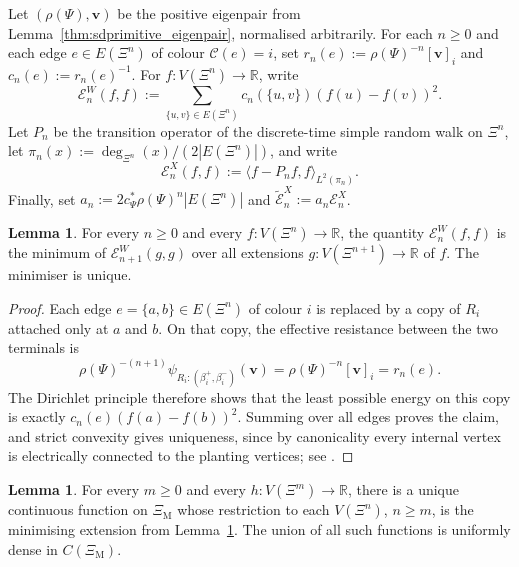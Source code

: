 \documentclass{article}
\theoremstyle{plain}
\theoremstyle{definition}
\newtheorem{lemma}[theorem]{Lemma}
\begin{document}
Let $(\rho(\Psi),\mathbf v)$ be the positive eigenpair from Lemma~\ref{thm:sdprimitive_eigenpair}, normalised arbitrarily.
For each $n\ge 0$ and each edge $e\in E(\Xi^n)$ of colour $\mathscr C(e)=i$, set $r_n(e):=\rho(\Psi)^{-n}[\mathbf v]_i$ and $c_n(e):=r_n(e)^{-1}$.
For $f:V(\Xi^n)\to\mathbb R$, write
\[
\mathcal E_n^{W}(f,f):=\sum_{\{u,v\}\in E(\Xi^n)} c_n(\{u,v\})(f(u)-f(v))^2.
\]
Let $P_n$ be the transition operator of the discrete-time simple random walk on $\Xi^n$, let $\pi_n(x):=\deg_{\Xi^n}(x)/(2|E(\Xi^n)|)$, and write
\[
\mathcal E_n^{X}(f,f):=\langle f-P_nf,f\rangle_{L^2(\pi_n)}.
\]
Finally, set $a_n:=2c_\Psi^*\rho(\Psi)^n|E(\Xi^n)|$ and $\widetilde{\mathcal E}_n^{X}:=a_n\mathcal E_n^{X}$.

\begin{lemma}\label{lem:sec31_trace_weighted}
For every $n\ge 0$ and every $f:V(\Xi^n)\to\mathbb R$, the quantity $\mathcal E_n^{W}(f,f)$ is the minimum of $\mathcal E_{n+1}^{W}(g,g)$ over all extensions $g:V(\Xi^{n+1})\to\mathbb R$ of $f$.
The minimiser is unique.
\end{lemma}

\begin{proof}
Each edge $e=\{a,b\}\in E(\Xi^n)$ of colour $i$ is replaced by a copy of $R_i$ attached only at $a$ and $b$.
On that copy, the effective resistance between the two terminals is
\[
\rho(\Psi)^{-(n+1)}\psi_{R_i:(\beta_i^+,\beta_i^-)}(\mathbf v)
=
\rho(\Psi)^{-n}[\mathbf v]_i
=
r_n(e).
\]
The Dirichlet principle therefore shows that the least possible energy on this copy is exactly $c_n(e)(f(a)-f(b))^2$.
Summing over all edges proves the claim, and strict convexity gives uniqueness, since by canonicality every internal vertex is electrically connected to the planting vertices; see \cite{kigami2001analysis}.
\end{proof}

\begin{lemma}\label{lem:sec31_continuous_harmonics}
For every $m\ge 0$ and every $h:V(\Xi^m)\to\mathbb R$, there is a unique continuous function on $\Xi_{\mathrm M}$ whose restriction to each $V(\Xi^n)$, $n\ge m$, is the minimising extension from Lemma~\ref{lem:sec31_trace_weighted}.
The union of all such functions is uniformly dense in $C(\Xi_{\mathrm M})$.
\end{lemma}
\end{document}
